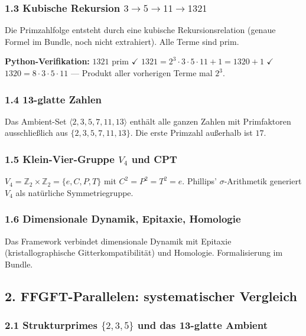 \subsubsection*{1.3 Kubische Rekursion $3 \to 5 \to 11 \to 1321$}

Die Primzahlfolge entsteht durch eine kubische Rekursionsrelation
(genaue Formel im Bundle, noch nicht extrahiert). Alle Terme sind prim.

\begin{mdframed}[style=ok]
\textbf{Python-Verifikation:} $1321$ prim $\checkmark$ \quad
$1321 = 2^3 \cdot 3 \cdot 5 \cdot 11 + 1 = 1320 + 1$ $\checkmark$\\
$1320 = 8 \cdot 3 \cdot 5 \cdot 11$ — Produkt aller vorherigen Terme mal $2^3$.
\end{mdframed}

\subsubsection*{1.4 13-glatte Zahlen}

Das Ambient-Set $\langle 2, 3, 5, 7, 11, 13 \rangle$ enthält alle ganzen Zahlen
mit Primfaktoren ausschließlich aus $\{2, 3, 5, 7, 11, 13\}$.
Die erste Primzahl außerhalb ist $17$.

\subsubsection*{1.5 Klein-Vier-Gruppe $V_4$ und CPT}

$V_4 = \mathbb{Z}_2 \times \mathbb{Z}_2 = \{e, C, P, T\}$ mit
$C^2 = P^2 = T^2 = e$. Phillips' $\sigma$-Arithmetik generiert $V_4$ als
natürliche Symmetriegruppe.

\subsubsection*{1.6 Dimensionale Dynamik, Epitaxie, Homologie}

Das Framework verbindet dimensionale Dynamik mit Epitaxie
(kristallographische Gitterkompatibilität) und Homologie.
Formalisierung im Bundle.

\subsection*{2. FFGFT-Parallelen: systematischer Vergleich}

\subsubsection*{2.1 Strukturprimes $\{2, 3, 5\}$ und das 13-glatte Ambient}

